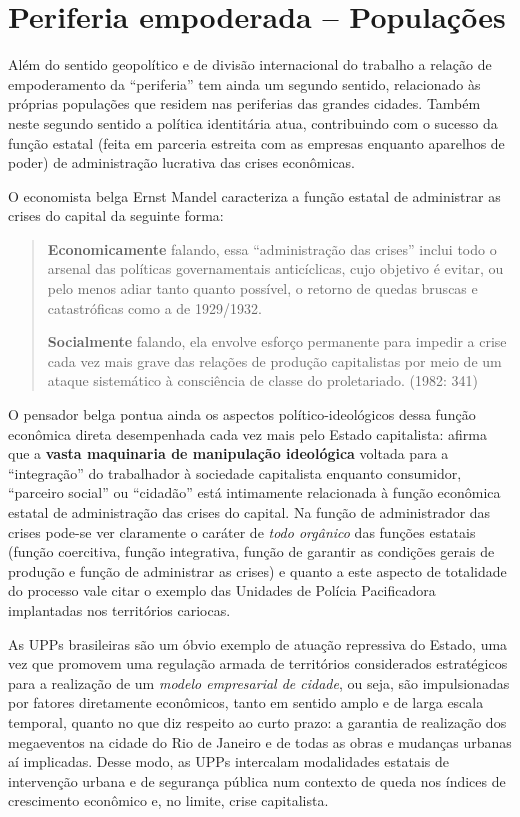 \chapter{Periferia empoderada -- Populações}

Além do sentido geopolítico e de divisão internacional do trabalho a
relação de empoderamento da ``periferia'' tem ainda um segundo sentido,
relacionado às próprias populações que residem nas periferias das
grandes cidades. Também neste segundo sentido a política identitária
atua, contribuindo com o sucesso da função estatal (feita em parceria
estreita com as empresas enquanto aparelhos de poder) de administração
lucrativa das crises econômicas.

O economista belga Ernst Mandel caracteriza a função estatal de
administrar as crises do capital da seguinte forma:

\begin{quote}
\textbf{Economicamente} falando, essa ``administração das crises''
inclui todo o arsenal das políticas governamentais anticíclicas, cujo
objetivo é evitar, ou pelo menos adiar tanto quanto possível, o retorno
de quedas bruscas e catastróficas como a de 1929/1932.

\textbf{Socialmente} falando, ela envolve esforço permanente para
impedir a crise cada vez mais grave das relações de produção
capitalistas por meio de um ataque sistemático à consciência de classe
do proletariado. (1982: 341)
\end{quote}

O pensador belga pontua ainda os aspectos político-ideológicos dessa
função econômica direta desempenhada cada vez mais pelo Estado
capitalista: afirma que a \textbf{vasta maquinaria de manipulação
ideológica} voltada para a ``integração'' do trabalhador à sociedade
capitalista enquanto consumidor, ``parceiro social'' ou ``cidadão'' está
intimamente relacionada à função econômica estatal de administração das
crises do capital. Na função de administrador das crises pode-se ver
claramente o caráter de \emph{todo orgânico} das funções estatais
(função coercitiva, função integrativa, função de garantir as condições
gerais de produção e função de administrar as crises) e quanto a este
aspecto de totalidade do processo vale citar o exemplo das Unidades de
Polícia Pacificadora implantadas nos territórios cariocas.

As UPPs brasileiras são um óbvio exemplo de atuação repressiva do
Estado, uma vez que promovem uma regulação armada de territórios
considerados estratégicos para a realização de um \emph{modelo
empresarial de cidade}, ou seja, são impulsionadas por fatores
diretamente econômicos, tanto em sentido amplo e de larga escala
temporal, quanto no que diz respeito ao curto prazo: a garantia de
realização dos megaeventos na cidade do Rio de Janeiro e de todas as
obras e mudanças urbanas aí implicadas. Desse modo, as UPPs intercalam
modalidades estatais de intervenção urbana e de segurança pública num
contexto de queda nos índices de crescimento econômico e, no limite,
crise capitalista.

